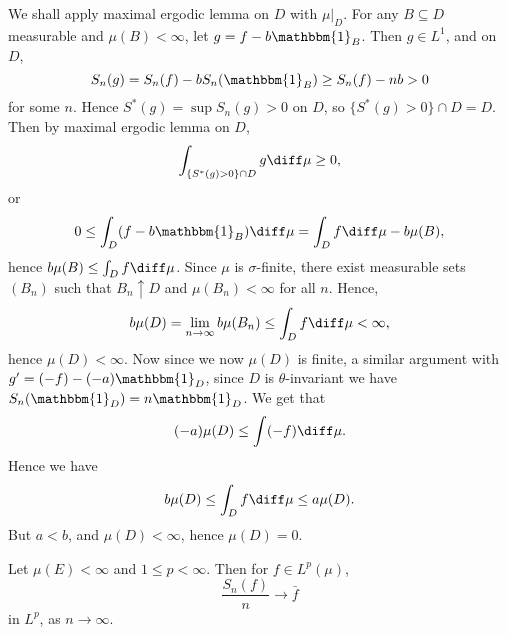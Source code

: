 \documentclass[12pt]{article}
\begin{document}
\begin{proofbox}
	We shall apply maximal ergodic lemma on $D$ with $\mu|_D$. For any $B \subseteq D$ measurable and $\mu(B) < \infty$, let $g = f - b \mathbbm{1}_{B}$. Then $g \in L^1$, and on $D$,
	\[
	S_n(g) = S_n(f) - b S_n(\mathbbm{1}_{B}) \geq S_n(f) - nb > 0
	\]
	for some $n$. Hence $S^{\ast}(g) = \sup S_n(g) > 0$ on $D$, so $\{S^{\ast}(g) > 0\} \cap D = D$. Then by maximal ergodic lemma on $D$,
	\[
		\int_{\{S^{\ast}(g) > 0\} \cap D} g \diff \mu \geq 0,
	\]
	or
	\[
	0 \leq \int_D (f - b \mathbbm{1}_{B}) \diff \mu = \int_D f \diff \mu - b \mu(B),
	\]
	hence $b \mu(B) \leq \int_D f \diff \mu$. Since $\mu$ is $\sigma$-finite, there exist measurable sets $(B_n)$ such that $B_n \uparrow D$ and $\mu(B_n) < \infty$ for all $n$. Hence,
	\[
	b \mu(D) = \lim_{n \to \infty} b \mu(B_n) \leq \int_D f \diff \mu < \infty,
	\]
	hence $\mu(D) < \infty$. Now since we now $\mu(D)$ is finite, a similar argument with $g' = (-f) - (-a) \mathbbm{1}_{D}$, since $D$ is $\theta$-invariant we have $S_n(\mathbbm{1}_{D}) = n \mathbbm{1}_{D}$. We get that
	\[
		(-a) \mu(D) \leq \int (-f) \diff \mu.
	\]
	Hence we have
	\[
	b \mu(D) \leq \int_D f \diff \mu \leq a \mu(D).
	\]
	But $a < b$, and $\mu(D) < \infty$, hence $\mu(D) = 0$.
\end{proofbox}

\begin{theorem}
	Let $\mu(E) < \infty$ and $1 \leq p < \infty$. Then for $f \in L^p(\mu)$,
	\[
	\frac{S_n(f)}{n} \to \bar f
	\]
	in $L^p$, as $n \to \infty$.
\end{theorem}
\end{document}
